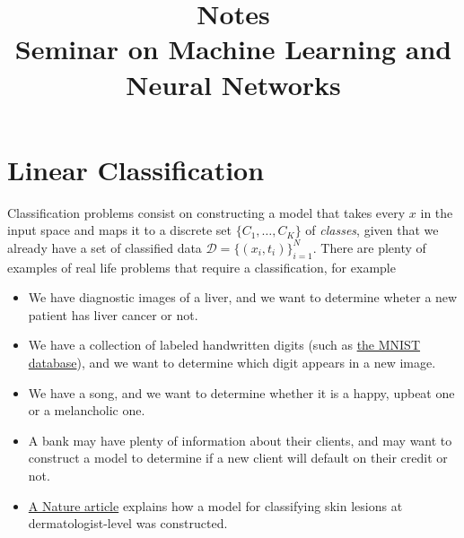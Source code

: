 \documentclass{report}
\title{Notes \\ Seminar on Machine Learning and Neural Networks}
\date{}
\author{}
\begin{document}
\maketitle





\chapter{Linear Classification}

Classification problems consist on constructing a model that takes every $x$ in the input space and maps it to a discrete set $\{C_1,\dots, C_K\}$ of \textit{classes}, given that we already have a set of classified data $\mathcal{D} = \{(x_i, t_i)\}_{i=1}^N$. There are plenty of examples of real life problems that require a classification, for example
\begin{itemize}
	\item We have diagnostic images of a liver, and we want to determine wheter a new patient has liver cancer or not.

	\item We have a collection of labeled handwritten digits (such as \href{http://yann.lecun.com/exdb/mnist/}{the MNIST database}), and we want to determine which digit appears in a new image.

	\item We have a song, and we want to determine whether it is a happy, upbeat one or a melancholic one.

	\item A bank may have plenty of information about their clients, and may want to construct a model to determine if a new client will default on their credit or not.

	\item \href{https://cs.stanford.edu/people/esteva/nature/}{A Nature article} explains how a model for classifying skin lesions at dermatologist-level was constructed.
\end{itemize}
\end{document}
